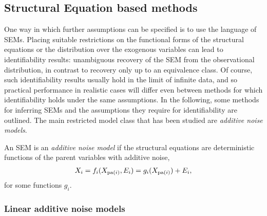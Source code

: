 \subsection{Structural Equation based methods}


One way in which further assumptions can be specified is to use the language of SEMs. 
Placing suitable restrictions on the functional forms of the structural equations or the distribution over the exogenous variables can lead to identifiability results: unambiguous recovery of the SEM from the observational distribution, in contrast to recovery only up to an equivalence class. 
Of course, such identifiability results usually hold in the limit of infinite data, and so practical performance in realistic cases will differ even between methods for which identifiability holds under the same assumptions.
In the following, some methods for inferring SEMs and the assumptions they require for identifiability are outlined. 
The main restricted model class that has been studied are \emph{additive noise models}.

\medskip

\begin{definition}
	An SEM is an \emph{additive noise model} if the structural equations are deterministic functions of the parent variables with additive noise, 
\begin{align}\label{eqn:causality-additive-noise-model}
X_i = f_i(X_{\operatorname{pa}(i)},E_i) = g_i(X_{\operatorname{pa}(i)}) + E_i,
\end{align}
for some functions $g_i$.
\end{definition}


\subsubsection{Linear additive noise models}

